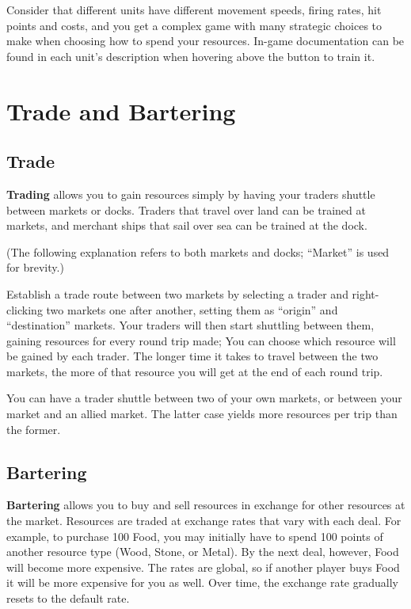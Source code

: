 \documentclass[a4paper,titlepage]{article}
\begin{document}
Consider that different units have different movement speeds, firing rates, hit points and costs, and you get a complex game with many strategic choices to make when choosing how to spend your resources. In-game documentation can be found in each unit’s description when hovering above the button to train it.

\clearpage

\section{Trade and Bartering}

\subsection*{Trade}

\textbf{Trading} allows you to gain resources simply by having your traders shuttle between markets or docks. Traders that travel over land can be trained at markets, and merchant ships that sail over sea can be trained at the dock.

(The following explanation refers to both markets and docks; “Market” is used for brevity.)

Establish a trade route between two markets by selecting a trader and right-clicking two markets one after another, setting them as “origin” and “destination” markets. Your traders will then start shuttling between them, gaining resources for every round trip made; You can choose which resource will be gained by each trader. The longer time it takes to travel between the two markets, the more of that resource you will get at the end of each round trip.

You can have a trader shuttle between two of your own markets, or between your market and an allied market. The latter case yields more resources per trip than the former.

\subsection*{Bartering}

\textbf{Bartering} allows you to buy and sell resources in exchange for other resources at the market. Resources are traded at exchange rates that vary with each deal. For example, to purchase 100 Food, you may initially have to spend 100 points of another resource type (Wood, Stone, or Metal). By the next deal, however, Food will become more expensive. The rates are global, so if another player buys Food it will be more expensive for you as well. Over time, the exchange rate gradually resets to the default rate.
\end{document}
